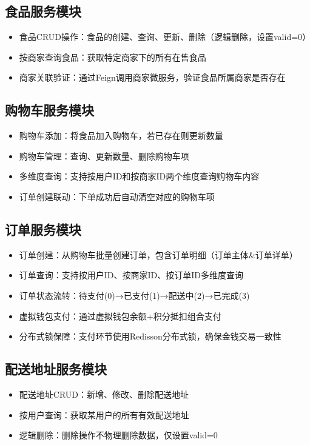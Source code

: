 \subsection{食品服务模块}

\begin{itemize}
	\item 食品CRUD操作：食品的创建、查询、更新、删除（逻辑删除，设置valid=0）
	\item 按商家查询食品：获取特定商家下的所有在售食品
	\item 商家关联验证：通过Feign调用商家微服务，验证食品所属商家是否存在
\end{itemize}

\subsection{购物车服务模块}

\begin{itemize}
	\item 购物车添加：将食品加入购物车，若已存在则更新数量
	\item 购物车管理：查询、更新数量、删除购物车项
	\item 多维度查询：支持按用户ID和按商家ID两个维度查询购物车内容
	\item 订单创建联动：下单成功后自动清空对应的购物车项
\end{itemize}

\subsection{订单服务模块}

\begin{itemize}
	\item 订单创建：从购物车批量创建订单，包含订单明细（订单主体\&订单详单）
	\item 订单查询：支持按用户ID、按商家ID、按订单ID多维度查询
	\item 订单状态流转：待支付(0)→已支付(1)→配送中(2)→已完成(3)
	\item 虚拟钱包支付：通过虚拟钱包余额+积分抵扣组合支付
	\item 分布式锁保障：支付环节使用Redisson分布式锁，确保金钱交易一致性
\end{itemize}

\subsection{配送地址服务模块}

\begin{itemize}
	\item 配送地址CRUD：新增、修改、删除配送地址
	\item 按用户查询：获取某用户的所有有效配送地址
	\item 逻辑删除：删除操作不物理删除数据，仅设置valid=0
\end{itemize}

